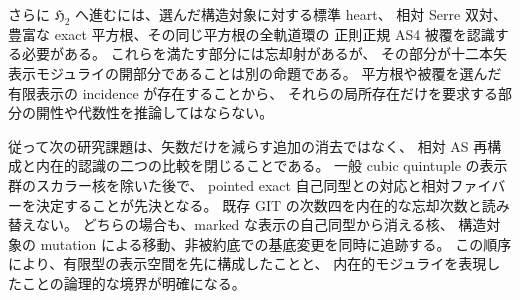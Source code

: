 \documentclass[a4paper,11pt]{ltjsarticle}
\numberwithin{equation}{section}
\theoremstyle{plain}
\theoremstyle{definition}
\theoremstyle{remark}
\newcommand{\HHstack}{\mathfrak H_2}
\begin{document}
さらに $\HHstack$ へ進むには、選んだ構造対象に対する標準 heart、
相対 Serre 双対、豊富な exact 平方根、その同じ平方根の全軌道環の
正則正規 AS4 被覆を認識する必要がある。
これらを満たす部分には忘却射があるが、
その部分が十二本矢表示モジュライの開部分であることは別の命題である。
平方根や被覆を選んだ有限表示の incidence が存在することから、
それらの局所存在だけを要求する部分の開性や代数性を推論してはならない。

従って次の研究課題は、矢数だけを減らす追加の消去ではなく、
相対 AS 再構成と内在的認識の二つの比較を閉じることである。
一般 cubic quintuple の表示群のスカラー核を除いた後で、
pointed exact 自己同型との対応と相対ファイバーを決定することが先決となる。
既存 GIT の次数四を内在的な忘却次数と読み替えない。
どちらの場合も、marked な表示の自己同型から消える核、
構造対象の mutation による移動、非被約底での基底変更を同時に追跡する。
この順序により、有限型の表示空間を先に構成したことと、
内在的モジュライを表現したことの論理的な境界が明確になる。



\end{document}
